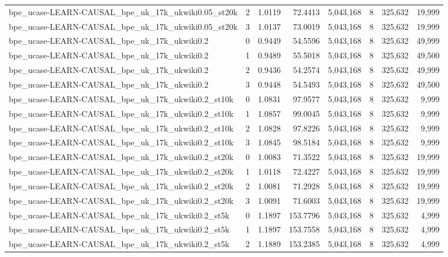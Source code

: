 \begin{tabular}{lrrrrrrr}
bpe\_ucase-LEARN-CAUSAL\_bpe\_uk\_17k\_ukwiki0.05\_st20k & 2 & 1.0119 & 72.4413 & 5,043,168 & 8 & 325,632 & 19,999 \\
bpe\_ucase-LEARN-CAUSAL\_bpe\_uk\_17k\_ukwiki0.05\_st20k & 3 & 1.0137 & 73.0019 & 5,043,168 & 8 & 325,632 & 19,999 \\
bpe\_ucase-LEARN-CAUSAL\_bpe\_uk\_17k\_ukwiki0.2 & 0 & 0.9449 & 54.5596 & 5,043,168 & 8 & 325,632 & 49,999 \\
bpe\_ucase-LEARN-CAUSAL\_bpe\_uk\_17k\_ukwiki0.2 & 1 & 0.9489 & 55.5018 & 5,043,168 & 8 & 325,632 & 49,500 \\
bpe\_ucase-LEARN-CAUSAL\_bpe\_uk\_17k\_ukwiki0.2 & 2 & 0.9436 & 54.2574 & 5,043,168 & 8 & 325,632 & 49,999 \\
bpe\_ucase-LEARN-CAUSAL\_bpe\_uk\_17k\_ukwiki0.2 & 3 & 0.9448 & 54.5493 & 5,043,168 & 8 & 325,632 & 49,500 \\
bpe\_ucase-LEARN-CAUSAL\_bpe\_uk\_17k\_ukwiki0.2\_st10k & 0 & 1.0831 & 97.9577 & 5,043,168 & 8 & 325,632 & 9,999 \\
bpe\_ucase-LEARN-CAUSAL\_bpe\_uk\_17k\_ukwiki0.2\_st10k & 1 & 1.0857 & 99.0045 & 5,043,168 & 8 & 325,632 & 9,999 \\
bpe\_ucase-LEARN-CAUSAL\_bpe\_uk\_17k\_ukwiki0.2\_st10k & 2 & 1.0828 & 97.8226 & 5,043,168 & 8 & 325,632 & 9,999 \\
bpe\_ucase-LEARN-CAUSAL\_bpe\_uk\_17k\_ukwiki0.2\_st10k & 3 & 1.0845 & 98.5184 & 5,043,168 & 8 & 325,632 & 9,999 \\
bpe\_ucase-LEARN-CAUSAL\_bpe\_uk\_17k\_ukwiki0.2\_st20k & 0 & 1.0083 & 71.3522 & 5,043,168 & 8 & 325,632 & 19,999 \\
bpe\_ucase-LEARN-CAUSAL\_bpe\_uk\_17k\_ukwiki0.2\_st20k & 1 & 1.0118 & 72.4227 & 5,043,168 & 8 & 325,632 & 19,999 \\
bpe\_ucase-LEARN-CAUSAL\_bpe\_uk\_17k\_ukwiki0.2\_st20k & 2 & 1.0081 & 71.2928 & 5,043,168 & 8 & 325,632 & 19,999 \\
bpe\_ucase-LEARN-CAUSAL\_bpe\_uk\_17k\_ukwiki0.2\_st20k & 3 & 1.0091 & 71.6003 & 5,043,168 & 8 & 325,632 & 19,999 \\
bpe\_ucase-LEARN-CAUSAL\_bpe\_uk\_17k\_ukwiki0.2\_st5k & 0 & 1.1897 & 153.7796 & 5,043,168 & 8 & 325,632 & 4,999 \\
bpe\_ucase-LEARN-CAUSAL\_bpe\_uk\_17k\_ukwiki0.2\_st5k & 1 & 1.1897 & 153.7558 & 5,043,168 & 8 & 325,632 & 4,999 \\
bpe\_ucase-LEARN-CAUSAL\_bpe\_uk\_17k\_ukwiki0.2\_st5k & 2 & 1.1889 & 153.2385 & 5,043,168 & 8 & 325,632 & 4,999 \\

\end{tabular}
